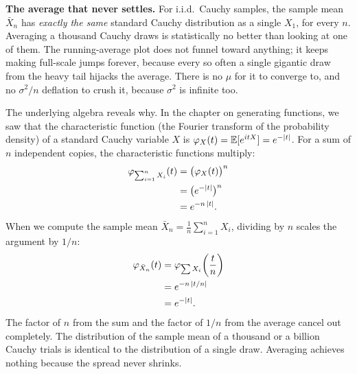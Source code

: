 \begin{paradoxbox}
\textbf{The average that never settles.} For i.i.d.\ Cauchy samples, the sample mean $\bar X_n$ has \emph{exactly the same} standard Cauchy distribution as a single $X_1$, for every $n$. Averaging a thousand Cauchy draws is statistically no better than looking at one of them. The running-average plot does not funnel toward anything; it keeps making full-scale jumps forever, because every so often a single gigantic draw from the heavy tail hijacks the average. There is no $\mu$ for it to converge to, and no $\sigma^2/n$ deflation to crush it, because $\sigma^2$ is infinite too.

The underlying algebra reveals why. In the chapter on generating functions, we saw that the characteristic function (the Fourier transform of the probability density) of a standard Cauchy variable $X$ is $\varphi_X(t) = \operatorname{\mathbb{E}}[e^{itX}] = e^{-\lvert t\rvert}$. For a sum of $n$ independent copies, the characteristic functions multiply:
\begin{align*}
  \varphi_{\sum_{i=1}^n X_i}(t) &= \bigl(\varphi_X(t)\bigr)^n \\
  &= \bigl(e^{-\lvert t\rvert}\bigr)^n \\
  &= e^{-n\,\lvert t\rvert}.
\end{align*}
When we compute the sample mean $\bar X_n = \frac1n \sum_{i=1}^n X_i$, dividing by $n$ scales the argument by $1/n$:
\begin{align*}
  \varphi_{\bar X_n}(t) &= \varphi_{\sum X_i}\!\left(\frac{t}{n}\right) \\
  &= e^{-n\,\lvert t/n\rvert} \\
  &= e^{-\lvert t\rvert}.
\end{align*}
The factor of $n$ from the sum and the factor of $1/n$ from the average cancel out completely. The distribution of the sample mean of a thousand or a billion Cauchy trials is identical to the distribution of a single draw. Averaging achieves nothing because the spread never shrinks.
\end{paradoxbox}

